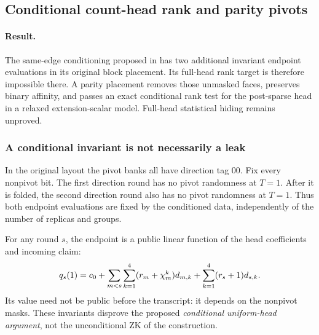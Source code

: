 \subsection{Conditional count-head rank and parity pivots}\label{note:zk-count-head}

\paragraph{Result.} The same-edge conditioning proposed in  has two additional invariant endpoint evaluations in its original block placement. Its full-head rank target is therefore impossible there. A parity placement removes those unmasked faces, preserves binary affinity, and passes an exact conditional rank test for the post-sparse head in a relaxed extension-scalar model. Full-head statistical hiding remains unproved.

\subsubsection{A conditional invariant is not necessarily a leak}

In the original layout the pivot banks all have direction tag $00$. Fix every nonpivot bit. The first direction round has no pivot randomness at $T=1$. After it is folded, the second direction round also has no pivot randomness at $T=1$. Thus both endpoint evaluations are fixed by the conditioned data, independently of the number of replicas and groups.

For any round $s$, the endpoint is a public linear function of the head coefficients and incoming claim:
\[
 q_s(1)=c_0+
 \sum_{m<s}\sum_{k=1}^4(r_m+\chi_m^k)d_{m,k}
 +\sum_{k=1}^4(r_s+1)d_{s,k}.
\]
Its value need not be public before the transcript: it depends on the nonpivot masks. These invariants disprove the proposed \emph{conditional uniform-head argument}, not the unconditional ZK of the construction.

